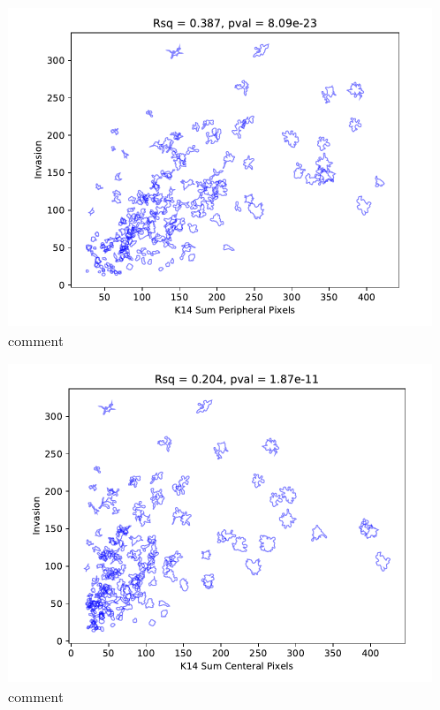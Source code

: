 \documentclass[10pt,letterpaper]{article}
\begin{document}
\begin{figure}[!h]
\includegraphics[width=\textwidth]{docs/01_paper/mouse_1_Day5_KPS.pdf}
\caption{comment} 
\label{fig3}
\end{figure}

\begin{figure}[!h]
\includegraphics[width=\textwidth]{docs/01_paper/mouse_1_Day5_KCS.pdf}
\caption{comment} 
\label{fig4}
\end{figure}
\end{document}
